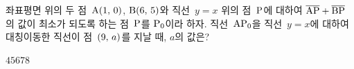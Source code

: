 좌표평면 위의 두 점~$\mathrm{A}(1,\mkern3mu 0)$, $\mathrm{B}(6,\mkern3mu 5)$와 직선~$y=x$ 위의 점~$\mathrm{P}$에 대하여 $\overline{\mathrm{AP}}+\overline{\mathrm{BP}}$의 값이 최소가 되도록 하는 점~$\mathrm{P}$를 $\mathrm{P_0}$이라 하자. 직선~$\mathrm{AP_0}$을 직선~$y=x$에 대하여 대칭이동한 직선이 점~$(9,\mkern3mu a)$를 지날 때, $a$의 값은?
\begin{choices32}{$4$}{$5$}{$6$}{$7$}{$8$}\end{choices32}
